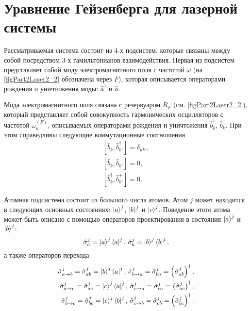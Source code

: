 \section{Уравнение Гейзенберга для лазерной системы}

Рассматриваемая система состоит из 4-х подсистем, которые связаны
между собой посредством 3-х гамильтонианов взаимодействия. Первая из
подсистем представляет собой моду электромагнитного поля с частотой
$\omega$ (на \autoref{figPart2Laser2_2} обозначена через $F$),
которая описывается операторами рождения и уничтожения моды: 
$\hat{a}^{\dag}$ и $\hat{a}$. 

Мода электромагнитного поля связана с
резервуаром $R_F$ (см. \autoref{figPart2Laser2_2}), который
представляет собой совокупность гармонических осцилляторов с частотой
$\omega_k^{(F)}$, описываемых операторами рождения и уничтожения
$\hat{b}_k^{\dag}$, $\hat{b}_k$. При этом справедливы следующие
коммутационные соотношения 
\begin{eqnarray}
\left[\hat{b}_k, \hat{b}^{\dag}_{k'}\right] = \delta_{kk'},
\nonumber \\
\left[\hat{b}_k, \hat{b}_{k'}\right] = 0,
\nonumber \\
\left[\hat{b}^{\dag}_k, \hat{b}^{+}_{k'}\right] = 0.
\nonumber
\end{eqnarray}

Атомная подсистема состоит из большого числа атомов. Атом $j$ может
находится в следующих основных состояниях:
$\ket{a}^j$, $\ket{b}^j$ и $\ket{c}^j$. Поведение
этого атома может быть описано с помощью операторов проектирования в
состояния $\ket{a}^j$ и $\ket{b}^j$:
\begin{equation}
\hat{\sigma}_a^j = \ket{a}^j\bra{a}^j,\,
\hat{\sigma}_b^j = \ket{b}^j\bra{b}^j,
\nonumber
\end{equation}
а также операторов перехода
\begin{eqnarray}
\hat{\sigma}_{a \rightarrow b}^j = \hat{\sigma}_{ab}^j =
\ket{b}^j\bra{a}^j,\,
\hat{\sigma}_{b \rightarrow a}^j = \hat{\sigma}_{ba}^j =
\left(\hat{\sigma}_{ab}^j\right)^{\dag},
\nonumber \\
\hat{\sigma}_{a \rightarrow c}^j = \hat{\sigma}_{ac}^j =
\ket{c}^j\bra{a}^j,\,
\hat{\sigma}_{c \rightarrow a}^j = \hat{\sigma}_{ca}^j =
\left(\hat{\sigma}_{ac}^j\right)^{\dag},
\nonumber \\
\hat{\sigma}_{b \rightarrow c}^j = \hat{\sigma}_{bc}^j =
\ket{c}^j\bra{b}^j,\,
\hat{\sigma}_{c \rightarrow b}^j = \hat{\sigma}_{cb}^j =
\left(\hat{\sigma}_{bc}^j\right)^{\dag}.
\nonumber 
\end{eqnarray}

